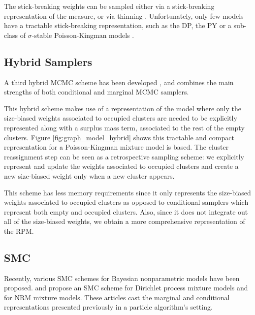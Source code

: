 The stick-breaking weights can be sampled either via a stick-breaking representation of the measure, or via thinning \cite{Favaro:2013fl}. Unfortunately, only few models have a tractable stick-breaking representation, such as the \gls{DP}, the \gls{PY} or a sub-class of $\sigma$-stable Poisson-Kingman models \cite{Favaro:2014bo}.


\subsection{Hybrid Samplers}

A third hybrid \gls{MCMC} scheme has been developed \cite{Lomeli:2015vd}, and combines the main strengths of both conditional and marginal \gls{MCMC} samplers.

This hybrid scheme makes use of a representation of the model where only the size-biased weights associated to occupied clusters are needed to be explicitly represented along with a surplus mass term, associated to the rest of the empty clusters.
Figure \ref{fig:graph_model_hybrid} shows this tractable and compact representation for a Poisson-Kingman mixture model is based.
The cluster reassignment step can be seen as a retrospective sampling scheme: we explicitly represent and update the weights associated to occupied clusters and create a new size-biased weight only when a new cluster appears. %

This scheme has less memory requirements since it only represents the size-biased weights associated to occupied clusters as opposed to conditional samplers which represent both empty and occupied clusters. Also, since it does not integrate out all of the size-biased weights, we obtain a more comprehensive representation of the \gls{RPM}.

\subsection{SMC}
Recently, various \gls{SMC} schemes for Bayesian nonparametric models have been proposed.
\cite{Fearnhead:2004gi} and \cite{Wood:2008hx} propose an \gls{SMC} scheme for Dirichlet process mixture models and \cite{Griffin:2017cz} for \gls{NRM} mixture models.
These articles cast the marginal and conditional representations presented previously in a particle algorithm's setting.


